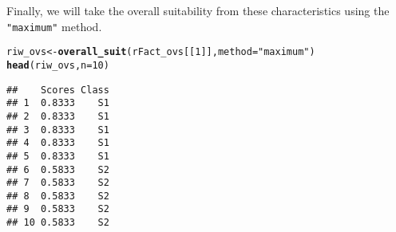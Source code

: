 \documentclass[11pt,fleqn]{article}\usepackage[]{graphicx}\usepackage[]{color}
\makeatletter
\newcommand{\hlnum}[1]{\textcolor[rgb]{0.686,0.059,0.569}{#1}}%
\newcommand{\hlstr}[1]{\textcolor[rgb]{0.192,0.494,0.8}{#1}}%
\newcommand{\hlstd}[1]{\textcolor[rgb]{0.345,0.345,0.345}{#1}}%
\newcommand{\hlkwb}[1]{\textcolor[rgb]{0.69,0.353,0.396}{#1}}%
\newcommand{\hlkwc}[1]{\textcolor[rgb]{0.333,0.667,0.333}{#1}}%
\newcommand{\hlkwd}[1]{\textcolor[rgb]{0.737,0.353,0.396}{\textbf{#1}}}%
\newenvironment{kframe}{%
 \def\at@end@of@kframe{}%
 \ifinner\ifhmode%
  \def\at@end@of@kframe{\end{minipage}}%
  \begin{minipage}{\columnwidth}%
 \fi\fi%
 \def\FrameCommand##1{\hskip\@totalleftmargin \hskip-\fboxsep
 \colorbox{shadecolor}{##1}\hskip-\fboxsep
     \hskip-\linewidth \hskip-\@totalleftmargin \hskip\columnwidth}%
 \MakeFramed {\advance\hsize-\width
   \@totalleftmargin\z@ \linewidth\hsize
   \@setminipage}}%
 {\par\unskip\endMakeFramed%
 \at@end@of@kframe}
\newenvironment{knitrout}{}{} %
\makeatother
\begin{document}
Finally, we will take the overall suitability from these characteristics using the \verb|"maximum"| method.
\begin{knitrout}
\color{fgcolor}\begin{kframe}
\begin{alltt}
\hlstd{riw_ovs} \hlkwb{<-} \hlkwd{overall_suit}\hlstd{(rFact_ovs[[}\hlnum{1}\hlstd{]],} \hlkwc{method} \hlstd{=} \hlstr{"maximum"}\hlstd{)}
\hlkwd{head}\hlstd{(riw_ovs,} \hlkwc{n} \hlstd{=} \hlnum{10}\hlstd{)}
\end{alltt}
\begin{verbatim}
##    Scores Class
## 1  0.8333    S1
## 2  0.8333    S1
## 3  0.8333    S1
## 4  0.8333    S1
## 5  0.8333    S1
## 6  0.5833    S2
## 7  0.5833    S2
## 8  0.5833    S2
## 9  0.5833    S2
## 10 0.5833    S2
\end{verbatim}
\end{kframe}
\end{knitrout}
\newpage
\end{document}
